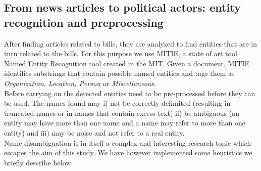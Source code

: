 \subsection{From news articles to political actors: entity recognition and preprocessing}\label{subsec:getting-entities}

After finding articles related to bills, they are analyzed to find entities that are in turn related to the bills. For this purpose we use MITIE, a state of art tool Named Entity Recognition tool created in the MIT. Given a document, MITIE identifies substrings that contain possible named entities and tags them as \emph{Organization, Location, Person} or \emph{Miscellaneous}.\\

Before carrying on the detected entities need to be pre-processed before they can be used. The names found may i) not be correctly delimited (resulting in truncated names or in names that contain excess text) ii) be ambiguous (an entity may have more than one name and a name may refer to more than one entity) and iii) may be noise and not refer to a real entity. \\

Name disambiguation is in itself a complex and interesting research topic which escapes the aim of this study. We have however implemented some heuristics we briefly describe below:\\

